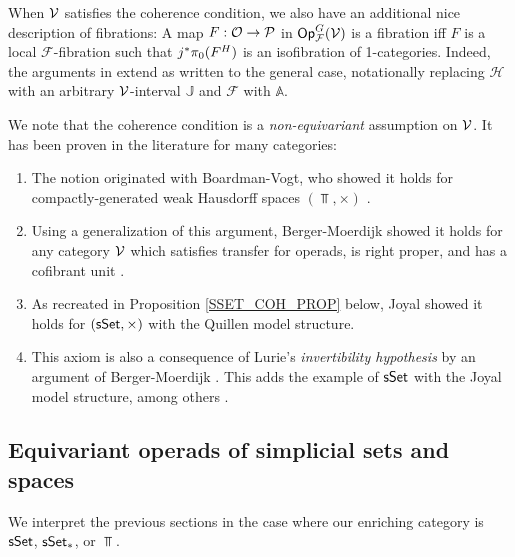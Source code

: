 \documentclass[a4paper,10pt
,draft
]{article}%
\renewcommand{\F}{\mathcal F}
\renewcommand{\1}{\eta}%
\begin{document}
\begin{remark}
      \label{FIB_ISOFIB_REM}
      When $\mathcal V$ satisfies the coherence condition, we also have an additional nice description of fibrations:
      A map $F: \mathcal{O} \to \mathcal{P}$ in $\Op^G_\F(\V)$ is a fibration iff
      $F$ is a local $\F$-fibration such that
      $j^{\**}\pi_0(F^H)$ is an isofibration of 1-categories.
      Indeed, the arguments in \cite[Propositions 2.3 and 2.5]{Ber07b} extend as written to the general case,
      notationally replacing $\mathcal H$ with an arbitrary $\mathcal V$-interval $\mathbb J$ and
      $\mathscr F$ with $\mathbb A$.
\end{remark}


\begin{remark}
      \label{COH_EX_REM}
      We note that the coherence condition is a \textit{non-equivariant} assumption on $\mathcal V$.
      It has been proven in the literature for many categories:
      \begin{enumerate}[label = (\roman*)]
      \item The notion originated with Boardman-Vogt, who showed it holds for compactly-generated weak Hausdorff spaces $(\Top, \times)$ \cite[Lem. 4.16]{BV73}.
      \item Using a generalization of this argument, Berger-Moerdijk showed it holds for any category $\mathcal V$ which satisfies transfer for operads, is right proper, and has a cofibrant unit \cite[Prop. 2.24]{BM13}.
      \item As recreated in Proposition \ref{SSET_COH_PROP} below, Joyal showed it holds for $(\mathsf{sSet}, \times)$ with the Quillen model structure.
      \item This axiom is also a consequence of Lurie's \textit{invertibility hypothesis} \cite[A.3.2.12]{Lur09} by an argument of Berger-Moerdijk \cite[Rem. 2.19]{BM13}.
            This adds the example of $\mathsf{sSet}$ with the Joyal model structure, among others \cite[A.3.2.23]{Lur09}.
      \end{enumerate}
\end{remark}




\subsection{Equivariant operads of simplicial sets and spaces}
\label{SSETMS_SEC}

We interpret the previous sections in the case where our enriching category is $\mathsf{sSet}$, $\sSet_{\**}$, or $\Top$.
\end{document}
